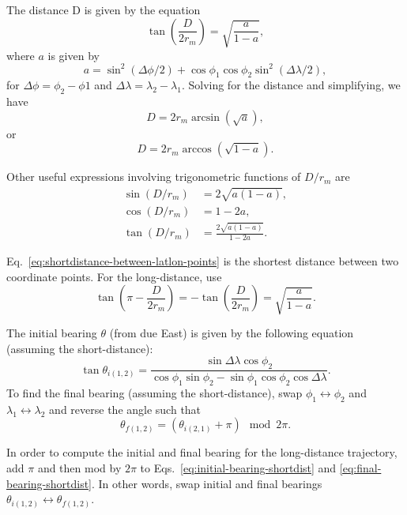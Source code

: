 \documentclass{hitec}
\numberwithin{equation}{section}
\begin{document}
The distance D is given by the equation
\begin{equation}\label{eq:shortdistance-between-latlon-points}
\tan\left(\frac{D}{2r_m}\right) = \sqrt{\frac{a}{1-a}},
\end{equation}
where $a$ is given by
\begin{equation}
a = \sin^2(\Delta\phi/2) + \cos\phi_1\cos\phi_2\sin^2(\Delta\lambda/2),
\end{equation}
for $\Delta\phi = \phi_2-\phi1$ and $\Delta\lambda = \lambda_2-\lambda_1$. Solving for the distance and simplifying, we have
\begin{equation}
D = 2r_m\arcsin(\sqrt{a}),
\end{equation}
or
\begin{equation}
D = 2r_m\arccos(\sqrt{1-a}).
\end{equation}

Other useful expressions involving trigonometric functions of $D/r_m$ are
\begin{align}
\sin(D/r_m) &= 2\sqrt{a(1-a)},\\
\cos(D/r_m) &= 1-2a,\\
\tan(D/r_m) &= \frac{2\sqrt{a(1-a)}}{1-2a}.
\end{align}

Eq.\ \eqref{eq:shortdistance-between-latlon-points} is the shortest distance between two coordinate points. For the long-distance, use
\begin{equation}
\tan\left(\pi-\frac{D}{2r_m}\right) = -\tan\left(\frac{D}{2r_m}\right) = \sqrt{\frac{a}{1-a}}.
\end{equation}

The initial bearing $\theta$ (from due East) is given by the following equation (assuming the short-distance):
\begin{equation}\label{eq:initial-bearing-shortdist}
\tan\theta_{i(1,2)} = \frac{\sin\Delta\lambda\cos\phi_2}{\cos\phi_1\sin\phi_2-\sin\phi_1\cos\phi_2\cos\Delta\lambda}.
\end{equation}
To find the final bearing (assuming the short-distance), swap $\phi_1\longleftrightarrow\phi_2$ and $\lambda_1\longleftrightarrow\lambda_2$ and reverse the angle such that
\begin{equation}\label{eq:final-bearing-shortdist}
\theta_{f(1,2)} = (\theta_{i(2,1)} + \pi)\mod 2\pi.
\end{equation}

In order to compute the initial and final bearing for the long-distance trajectory, add $\pi$ and then mod by $2\pi$ to Eqs.\ \eqref{eq:initial-bearing-shortdist} and \eqref{eq:final-bearing-shortdist}. In other words, swap initial and final bearings $\theta_{i(1,2)}\longleftrightarrow\theta_{f(1,2)}$.\\
\end{document}
